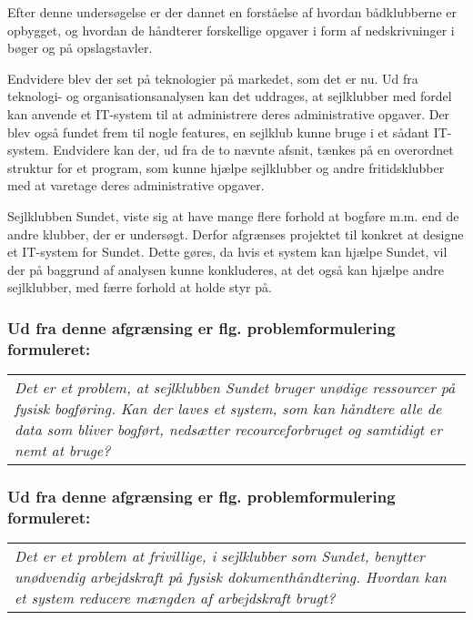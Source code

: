Efter denne undersøgelse er der dannet en forståelse af hvordan bådklubberne er opbygget, og hvordan de håndterer
forskellige opgaver i form af nedskrivninger i bøger og på opslagstavler.

Endvidere blev der set på teknologier på markedet, som det er nu. Ud fra teknologi- og organisationsanalysen kan det
uddrages, at sejlklubber med fordel kan anvende et IT-system til at administrere deres administrative opgaver. Der blev
også fundet frem til nogle features, en sejlklub kunne bruge i et sådant IT-system. Endvidere kan der, ud fra de to
nævnte afsnit, tænkes på en overordnet struktur for et program, som kunne hjælpe sejlklubber og andre fritidsklubber med
at varetage deres administrative opgaver.

Sejlklubben Sundet, viste sig at have mange flere forhold at bogføre m.m. end de andre klubber, der er undersøgt. Derfor afgrænses projektet til konkret at designe et IT-system for Sundet. Dette gøres, da hvis et system kan hjælpe Sundet, vil der på baggrund af analysen kunne konkluderes, at det også kan hjælpe andre sejlklubber, med færre forhold at holde styr på. 

\subsubsection*{Ud fra denne afgrænsing er flg. problemformulering formuleret:}
\begin{center}
\begin{tabular}{|p{14cm}|}
\textit{Det er et problem, at sejlklubben Sundet bruger unødige ressourcer på fysisk bogføring. Kan der laves et system, som kan håndtere alle de data som bliver bogført, nedsætter recourceforbruget og samtidigt er nemt at bruge? }
\end{tabular}
\end{center}
\subsubsection*{Ud fra denne afgrænsing er flg. problemformulering formuleret:}
\begin{center}
\begin{tabular}{|p{14cm}|}
\textit{Det er et problem at frivillige, i sejlklubber som Sundet, benytter unødvendig arbejdskraft på fysisk dokumenthåndtering. Hvordan kan et system reducere mængden af arbejdskraft brugt? }
\end{tabular}
\end{center}

